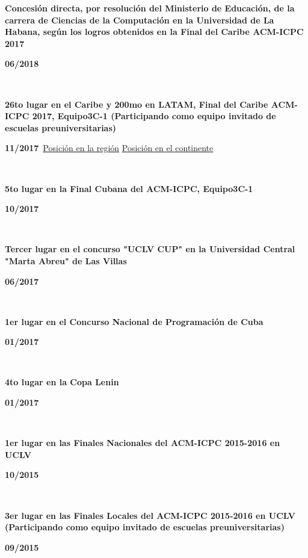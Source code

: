 \documentclass{article}
\begin{document}
\begin{minipage}{0.8\textwidth}
\parbox{0.8\linewidth}{\textbf{Concesión directa, por resolución del Ministerio de Educación, de la carrera de Ciencias de la Computación en la Universidad de La Habana, según los logros obtenidos en la Final del Caribe ACM-ICPC 2017}} \hfill \textbf{06/2018}\
\
\end{minipage} \
\begin{minipage}{0.8\textwidth}
\parbox{0.8\linewidth}{\textbf{26to lugar en el Caribe y 200mo en LATAM, Final del Caribe ACM-ICPC 2017, Equipo3C-1 (Participando como equipo invitado de escuelas preuniversitarias)}} \hfill \textbf{11/2017}\
\href{https://matcomgrader.com/media/posts/5167/ranking/caribbean.png}{Posición en la región}
\href{https://matcomgrader.com/media/posts/5167/ranking/general.png}{Posición en el continente}
\
\end{minipage} \hfill {}\\
\begin{minipage}{0.8\textwidth}
\parbox{0.8\linewidth}{\textbf{5to lugar en la Final Cubana del ACM-ICPC, Equipo3C-1}} \hfill \textbf{10/2017}\
\
\end{minipage}\
\begin{minipage}{0.8\textwidth}
\parbox{0.8\linewidth}{\textbf{Tercer lugar en el concurso "UCLV CUP" en la Universidad Central "Marta Abreu" de Las Villas}} \hfill \textbf{06/2017}\
\
\end{minipage}\
\begin{minipage}{0.8\textwidth}
\parbox{0.8\linewidth}{\textbf{1er lugar en el Concurso Nacional de Programación de Cuba}} \hfill \textbf{01/2017}\
\
\end{minipage}\
\begin{minipage}{0.8\textwidth}
\parbox{0.8\linewidth}{\textbf{4to lugar en la Copa Lenin}} \hfill \textbf{01/2017}\
\
\end{minipage}\
\begin{minipage}{0.8\textwidth}
\parbox{0.8\linewidth}{\textbf{1er lugar en las Finales Nacionales del ACM-ICPC 2015-2016 en UCLV }} \hfill \textbf{10/2015}\
\
\end{minipage} \
\begin{minipage}{0.8\textwidth}
\parbox{0.8\linewidth}{\textbf{3er lugar en las Finales Locales del ACM-ICPC 2015-2016 en UCLV (Participando como equipo invitado de escuelas preuniversitarias)}} \hfill \textbf{09/2015}\
\
\end{minipage}\
\end{document}
